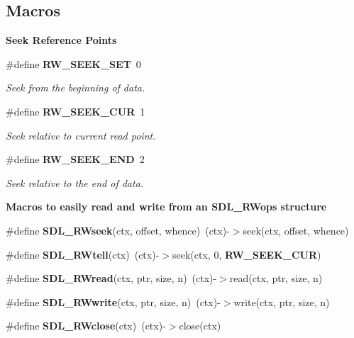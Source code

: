 \subsection*{Macros}
\begin{Indent}{\bf Seek Reference Points}\par
\begin{DoxyCompactItemize}
\item 
\#define {\bf R\+W\+\_\+\+S\+E\+E\+K\+\_\+\+S\+E\+T}~0\label{_s_d_l__rwops_8h_ac028b032bb8230df64bc6284e04789f5}

\begin{DoxyCompactList}\small\item\em Seek from the beginning of data. \end{DoxyCompactList}\item 
\#define {\bf R\+W\+\_\+\+S\+E\+E\+K\+\_\+\+C\+U\+R}~1\label{_s_d_l__rwops_8h_aba5f3b60c197def370ffa2ca1ab1348d}

\begin{DoxyCompactList}\small\item\em Seek relative to current read point. \end{DoxyCompactList}\item 
\#define {\bf R\+W\+\_\+\+S\+E\+E\+K\+\_\+\+E\+N\+D}~2\label{_s_d_l__rwops_8h_a6cf141faabd1b8f2ec3c03cf76eaf553}

\begin{DoxyCompactList}\small\item\em Seek relative to the end of data. \end{DoxyCompactList}\end{DoxyCompactItemize}
\end{Indent}
\begin{Indent}{\bf Macros to easily read and write from an S\+D\+L\+\_\+\+R\+Wops structure}\par
\begin{DoxyCompactItemize}
\item 
\#define {\bfseries S\+D\+L\+\_\+\+R\+Wseek}(ctx,  offset,  whence)~(ctx)-\/$>$seek(ctx, offset, whence)\label{_s_d_l__rwops_8h_a21053fbfbd96536cb7b9404a12f66822}

\item 
\#define {\bfseries S\+D\+L\+\_\+\+R\+Wtell}(ctx)~(ctx)-\/$>$seek(ctx, 0, {\bf R\+W\+\_\+\+S\+E\+E\+K\+\_\+\+C\+U\+R})\label{_s_d_l__rwops_8h_abda2d76d76788e378d4d27344eb71d43}

\item 
\#define {\bfseries S\+D\+L\+\_\+\+R\+Wread}(ctx,  ptr,  size,  n)~(ctx)-\/$>$read(ctx, ptr, size, n)\label{_s_d_l__rwops_8h_a49822992c9b056f6cf6cfc52c9a13050}

\item 
\#define {\bfseries S\+D\+L\+\_\+\+R\+Wwrite}(ctx,  ptr,  size,  n)~(ctx)-\/$>$write(ctx, ptr, size, n)\label{_s_d_l__rwops_8h_a83549e70a4a09a1d10c7a1b14b5cbdf4}

\item 
\#define {\bfseries S\+D\+L\+\_\+\+R\+Wclose}(ctx)~(ctx)-\/$>$close(ctx)\label{_s_d_l__rwops_8h_a02700bab029c9438c0102457822c1231}

\end{DoxyCompactItemize}
\end{Indent}
